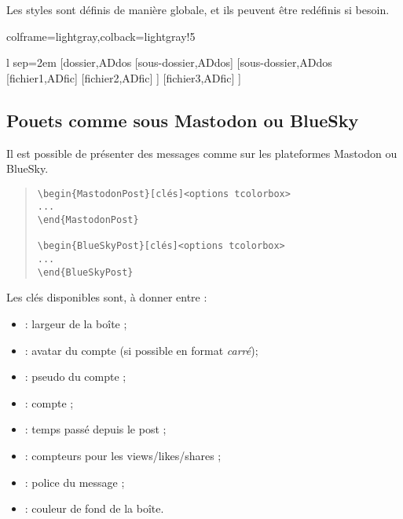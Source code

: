 \documentclass[11pt,a4paper]{ltxdoc}
\begin{document}
Les styles sont définis de manière globale, et ils peuvent être redéfinis si besoin.

\begin{tcblisting}{colframe=lightgray,colback=lightgray!5}
\begin{ArborDossiers}%
    [Police=\sffamily,CoulIcoD=yellow!50!pink,AffIcoF,CoulIcoF=teal,EspaceV=0.5em]%
    {l sep=2em}
    [dossier,ADdos
        [sous-dossier,ADdos]
        [sous-dossier,ADdos
            [fichier1,ADfic]
            [fichier2,ADfic]
        ]
        [fichier3,ADfic]
    ]
\end{ArborDossiers}
\end{tcblisting}

\pagebreak

\subsection{Pouets comme sous Mastodon ou BlueSky}

Il est possible de présenter des messages comme sur les plateformes Mastodon ou BlueSky.

\begin{quote}
\begin{verbatim}
\begin{MastodonPost}[clés]<options tcolorbox>
...
\end{MastodonPost}

\begin{BlueSkyPost}[clés]<options tcolorbox>
...
\end{BlueSkyPost}
\end{verbatim}
\end{quote}

Les \textsf{clés} disponibles sont, à donner entre \MontreCode{[...]} :
\begin{itemize}
	\item {} : largeur de la boîte ;
	\item {} : avatar du compte  (si possible en format \textit{carré});
	\item {} : pseudo du compte ;
	\item {} : compte ;
	\item {} : temps passé depuis le post ;
	\item {} : compteurs pour les views/likes/shares ;
	\item {} : police du message ;
	\item {} : couleur de fond de la boîte.
\end{itemize}
\end{document}
